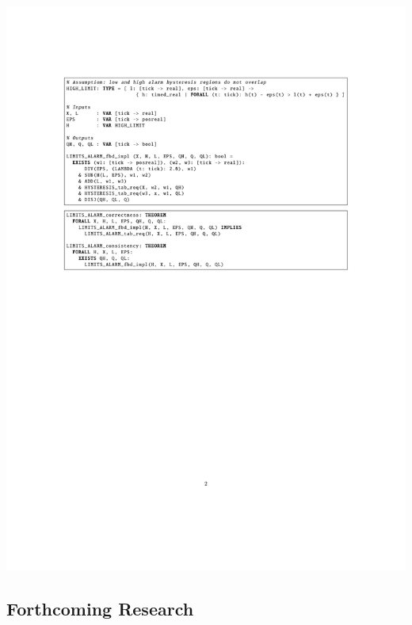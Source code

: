 \documentclass[a0,landscape]{a0poster}
\def\graphspacing{\vspace{.5cm}}
\begin{document}
\begin{multicols}{4}
\begin{center}\graphspacing
\includegraphics[width=\linewidth]{figures/limits_alarm/limits_alarm_pvs_theorems}
\end{center}\graphspacing


{\color{Blue} \subsection*{Forthcoming Research}}


\end{multicols}
\end{document}
